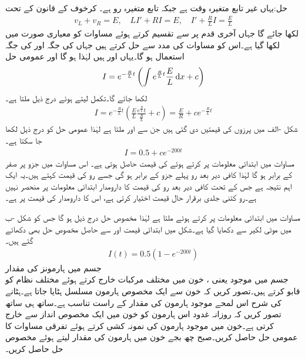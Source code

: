 حل:یہاں غیر تابع متغیرہ وقت  ہے جبکہ تابع متغیرہ رو  ہے۔ کرخوف کے قانون کے تحت 
\begin{align*}
v_L+v_R=E, \quad L I'+RI=E, \quad I'+\frac{R}{L}I=\frac{E}{L}
\end{align*}
لکھا جائے گا جہاں آخری قدم پر  سے تقسیم کرتے ہوئے مساوات کو معیاری صورت میں لکھا گیا ہے۔اس کو مساوات  کی مدد سے حل کرتے ہیں جہاں  کی جگہ  اور  کی جگہ  استعمال ہو گا۔یہاں  اور  ہیں لہٰذا  ہو گا اور عمومی حل
\begin{align*}
I=e^{-\frac{R}{L}t}\left(\int e^{\frac{R}{L}t}  \frac{E}{L} \dif x+c\right)
\end{align*}
لکھا جائے گا۔تکمل لیتے ہوئے درج ذیل ملتا ہے۔
\begin{align}\label{مساوات_سادہ_اول_برقی_مزاحمت_امالہ_سلسلہ_وار}
I=e^{-\frac{R}{L}t}\left(\frac{E}{L} \frac{e^{\frac{R}{L}}t}{\frac{R}{L}}+c\right)=\frac{E}{R}+ce^{-\frac{R}{L}t}
\end{align}
شکل -الف میں پرزوں کی قیمتیں دی گئی ہیں جن سے  اور
  ملتا ہے لہٰذا عمومی حل کو درج ذیل لکھا جا سکتا ہے۔
\begin{align}
I=0.5+ce^{-200t}
\end{align} 
مساوات  میں ابتدائی معلومات پر کرتے ہوئے  کی قیمت حاصل ہوتی ہے۔ اس مساوات میں  جزو  پر صفر کے برابر ہو گا لہٰذا کافی دیر بعد رو پہلے جزو  کے برابر ہو گی جسے رو کی  قیمت کہتے ہیں۔یہ ایک اہم نتیجہ ہے جس کے  تحت کافی دیر بعد رو کی قیمت کا دارومدار ابتدائی معلومات پر منحصر نہیں ہے۔رو کتنی جلدی برقرار حال قیمت اختیار کرتی ہے، اس کا دارومدار  کی قیمت پر ہے۔

مساوات  میں ابتدائی معلومات  پر کرتے   ہوئے  ملتا ہے لہٰذا مخصوص حل درج ذیل ہو گا جس کو شکل -ب میں موٹی لکیر سے دکھایا گیا ہے۔شکل میں ابتدائی قیمت  اور  سے حاصل مخصوص حل بھی دکھائے گئے ہیں۔
\begin{align}
I(t)=0.5(1-e^{-200t})
\end{align}
\quad جسم میں ہارمونز کی مقدار\\
جسم میں موجود  یعنی  ، خون میں مختلف مرکبات خارج کرتے ہوئے مختلف نظام کو قابو کرتے ہیں۔تصور کریں کہ خون سے ایک مخصوص ہارمون مسلسل ہٹایا جاتا ہے۔ہٹانے کی شرح اس لمحے موجود ہارمون کی مقدار کے راست تناسب ہے۔ساتھ ہی ساتھ تصور کریں کہ روزانہ غدود اس ہارمون کو خون میں ایک مخصوص انداز سے خارج کرتی ہے۔خون میں موجود ہارمون کی نمونہ کشی کرتے ہوئے تفرقی مساوات کا عمومی حل حاصل کریں۔صبح چھ بجے خون میں ہارمون کی مقدار  لیتے ہوئے مخصوص حل حاصل کریں۔  

